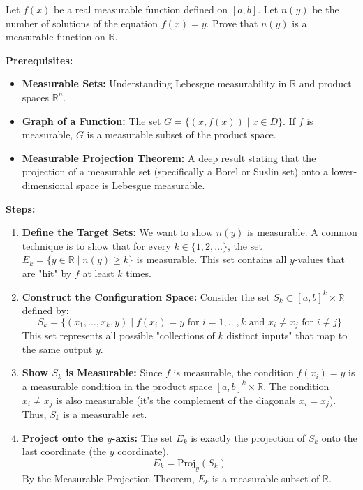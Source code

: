 \begin{exercise}
\label{analysis:2012:4}
Let $f(x)$ be a real measurable function defined on $[a,b]$. Let $n(y)$ be the number of solutions of the equation $f(x)=y$. Prove that $n(y)$ is a measurable function on $\mathbb{R}$.
\end{exercise}

\begin{solution}
\textbf{Prerequisites:}
\begin{itemize}
    \item \textbf{Measurable Sets:} Understanding Lebesgue measurability in $\mathbb{R}$ and product spaces $\mathbb{R}^n$.
    \item \textbf{Graph of a Function:} The set $G = \{(x, f(x)) \mid x \in D\}$. If $f$ is measurable, $G$ is a measurable subset of the product space.
    \item \textbf{Measurable Projection Theorem:} A deep result stating that the projection of a measurable set (specifically a Borel or Suslin set) onto a lower-dimensional space is Lebesgue measurable.
\end{itemize}

\bigskip

\textbf{Steps:}
\begin{enumerate}
    \item \textbf{Define the Target Sets:} We want to show $n(y)$ is measurable. A common technique is to show that for every $k \in \{1, 2, \dots\}$, the set $E_k = \{y \in \mathbb{R} \mid n(y) \geq k\}$ is measurable. This set contains all $y$-values that are "hit" by $f$ at least $k$ times.
    
    \item \textbf{Construct the Configuration Space:} Consider the set $S_k \subset [a, b]^k \times \mathbb{R}$ defined by:
    \[ S_k = \{(x_1, \dots, x_k, y) \mid f(x_i) = y \text{ for } i=1,\dots,k \text{ and } x_i \neq x_j \text{ for } i \neq j \} \]
    This set represents all possible "collections of $k$ distinct inputs" that map to the same output $y$.

    \item \textbf{Show $S_k$ is Measurable:} Since $f$ is measurable, the condition $f(x_i) = y$ is a measurable condition in the product space $[a,b]^k \times \mathbb{R}$. The condition $x_i \neq x_j$ is also measurable (it's the complement of the diagonals $x_i = x_j$). Thus, $S_k$ is a measurable set.

    \item \textbf{Project onto the $y$-axis:} The set $E_k$ is exactly the projection of $S_k$ onto the last coordinate (the $y$ coordinate). 
    \[ E_k = \text{Proj}_y(S_k) \]
    By the Measurable Projection Theorem, $E_k$ is a measurable subset of $\mathbb{R}$.


\end{enumerate}
\end{solution}
